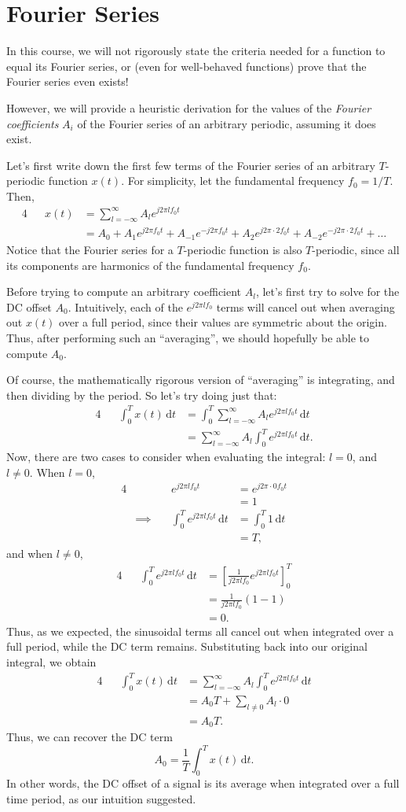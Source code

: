 \documentclass[letterpaper]{article}
\theoremstyle{remark}
\newcommand{\dt}{\mathrm{d}t}
\newcommand{\eqn}[1]{\begin{alignat*}{4}#1\end{alignat*}}
\newcommand*{\thus}{&\implies\quad&}
\begin{document}
\section{Fourier Series}
In this course, we will not rigorously state the criteria needed for a function to equal its Fourier series, or (even for well-behaved functions) prove that the Fourier series even exists!

However, we will provide a heuristic derivation for the values of the \emph{Fourier coefficients} $A_i$ of the Fourier series of an arbitrary periodic, assuming it does exist.

Let's first write down the first few terms of the Fourier series of an arbitrary $T$-periodic function $x(t)$. For simplicity, let the fundamental frequency $f_0 = 1 / T$. Then,
\eqn{
    && x(t) &= \sum_{l=-\infty}^\infty A_l e^{j2\pi l f_0 t} \\
    &&&= A_0 + A_1 e^{j2\pi f_0 t} + A_{-1} e^{-j2\pi f_0 t} + A_2 e^{j2\pi \cdot 2 f_0 t} + A_{-2} e^{-j2\pi \cdot 2 f_0 t} + \ldots 
}
Notice that the Fourier series for a $T$-periodic function is also $T$-periodic, since all its components are harmonics of the fundamental frequency $f_0$.

Before trying to compute an arbitrary coefficient $A_l$, let's first try to solve for the DC offset $A_0$. Intuitively, each of the $e^{j2\pi l f_0}$ terms will cancel out when averaging out $x(t)$ over a full period, since their values are symmetric about the origin. Thus, after performing such an ``averaging'', we should hopefully be able to compute $A_0$.

Of course, the mathematically rigorous version of ``averaging'' is integrating, and then dividing by the period. So let's try doing just that:
\eqn{
    && \int_0^T x(t) \, \dt &= \int_0^T \sum_{l=-\infty}^\infty A_l e^{j2\pi l f_0 t} \, \dt \\
    &&&= \sum_{l=-\infty}^\infty A_l \int_0^T e^{j2\pi l f_0 t} \, \dt.
}
Now, there are two cases to consider when evaluating the integral: $l = 0$, and $l \ne 0$. When $l = 0$,
\eqn{
    && e^{j2\pi l f_0 t} &= e^{j2\pi \cdot 0 f_0 t} \\
    &&&= 1 \\
    \thus \int_0^T e^{j2\pi l f_0 t} \, \dt &= \int_0^T 1 \, \dt \\
    &&&= T,
}
and when $l \ne 0$,
\eqn{
    && \int_0^T e^{j2\pi l f_0 t} \, \dt &= \left[ \frac{1}{j2\pi l f_0} e^{j 2\pi l f_0 t} \right]_0^T \\
    &&&= \frac{1}{j2\pi l f_0} (1 - 1) \\
    &&&= 0.
}
Thus, as we expected, the sinusoidal terms all cancel out when integrated over a full period, while the DC term remains. Substituting back into our original integral, we obtain
\eqn{
    && \int_0^T x(t) \, \dt &= \sum_{l=-\infty}^\infty A_l \int_0^T e^{j2\pi l f_0 t} \, \dt \\
    &&&= A_0T + \sum_{l \ne 0} A_l \cdot 0 \\
    &&&= A_0 T.
}
Thus, we can recover the DC term
\[
    A_0 = \frac{1}{T} \int_0^T x(t) \, \dt.
\]
In other words, the DC offset of a signal is its average when integrated over a full time period, as our intuition suggested.
\end{document}
